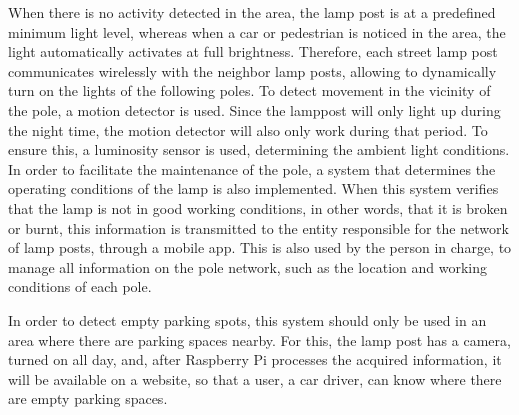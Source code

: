 When there is no activity detected in the area, the lamp post is at a predefined minimum light level, whereas when a car or pedestrian is noticed in the area, the light automatically activates at full brightness. Therefore, each street lamp post communicates wirelessly with the neighbor lamp posts, allowing to dynamically turn on the lights of the following poles. To detect movement in the vicinity of the pole, a motion detector is used. Since the lamppost will only light up during the night time, the motion detector will also only work during that period. To ensure this, a luminosity sensor is used, determining the ambient light conditions. In order to facilitate the maintenance of the pole, a system that determines the operating conditions of the lamp is also implemented. When this system verifies that the lamp is not in good working conditions, in other words, that it is broken or burnt, this information is transmitted to the entity responsible for the network of lamp posts, through a mobile app. This is also used by the person in charge, to manage all information on the pole network, such as the location and working conditions of each pole.

In order to detect empty parking spots, this system should only be used in an area where there are parking spaces nearby. For this, the lamp post has a camera, turned on all day, and, after Raspberry Pi processes the acquired information, it will be available on a website, so that a user, a car driver, can know where there are empty parking spaces.


